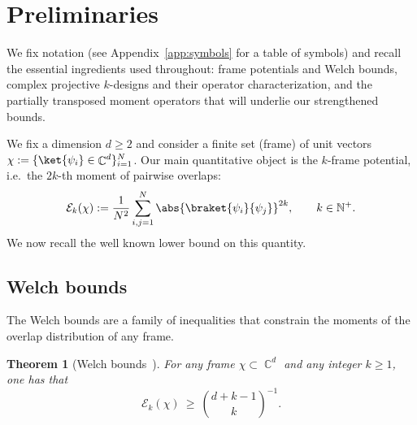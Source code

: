 \documentclass[aps,twocolumn,pra,superscriptaddress,nofootinbib]{revtex4-2}
\newtheorem{thm}{Theorem}
\DeclareMathOperator{\C}{\mathbb{C}} %
\begin{document}
\section{Preliminaries}\label{sec:prelim}

We fix notation (see Appendix~\ref{app:symbols} for a table of symbols) and recall the essential ingredients used throughout: frame potentials and Welch bounds, complex projective $k$-designs and their operator characterization, and the partially transposed moment operators that will underlie our strengthened bounds.

We fix a dimension $d\ge 2$ and consider a finite set (frame) of unit vectors $\chi:=\{\ket{\psi_i}\in\C^d\}_{i=1}^N$.
Our main quantitative object is the $k$-frame potential, i.e.\ the $2k$-th moment of pairwise overlaps:
\begin{equation}\label{Eq:kEnergyDef}
  \mathcal{E}_k(\chi)
  := \frac{1}{N^2}\sum_{i,j=1}^N \abs{\braket{\psi_i}{\psi_j}}^{2k},
  \qquad k\in \mathbb{N}^+.
\end{equation}
We now recall the well known lower bound on this quantity.

\subsection{Welch bounds}
The Welch bounds are a family of inequalities that constrain the moments of the overlap distribution of any frame.

\begin{thm}[Welch bounds~\cite{WelchBound}]\label{Th:Welch}
For any frame $\chi\subset\C^d$ and any integer $k\ge 1$, one has that
\begin{equation}\label{Eq:WelchBound}
  \mathcal{E}_k(\chi)\ \ge\ \binom{d+k-1}{k}^{-1}.
\end{equation}
\end{thm}
\end{document}
